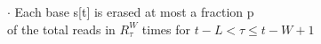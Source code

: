 \documentclass[preview]{standalone}
\begin{document}
\begin{center}
$\cdot$ Each base s[t] is erased at most a fraction p\\ of the total reads in $R^W_{\tau}$ times for $t-L < \tau \le t-W+1$
\end{center}
\end{document}
